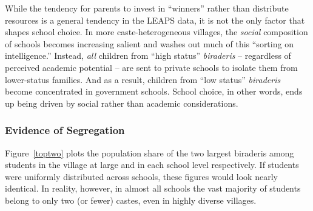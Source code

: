 \documentclass[Eubank_pk_ethnic_sorting.tex]{subfiles}
\begin{document}
While the tendency for parents to invest in ``winners'' rather than distribute resources is a general tendency in the LEAPS data, it is not the only factor that shapes school choice.  In more caste-heterogeneous villages, the \emph{social} composition of schools becomes increasing salient and washes out much of this ``sorting on intelligence.'' Instead, \emph{all} children from ``high status'' \emph{biraderis} -- regardless of perceived academic potential -- are sent to private schools to isolate them from lower-status families. And as a result, children from ``low status'' \emph{biraderis} become concentrated in government schools. School choice, in other words, ends up being driven by social rather than academic considerations. 

\subsubsection{Evidence of Segregation}

Figure~\ref{toptwo} plots the population share of the two largest biraderis among students in the village at large and in each school level respectively. If students were uniformly distributed across schools, these figures would look nearly identical. In reality, however, in almost all schools the vast majority of students belong to only two (or fewer) castes, even in highly diverse villages. 
\end{document}
